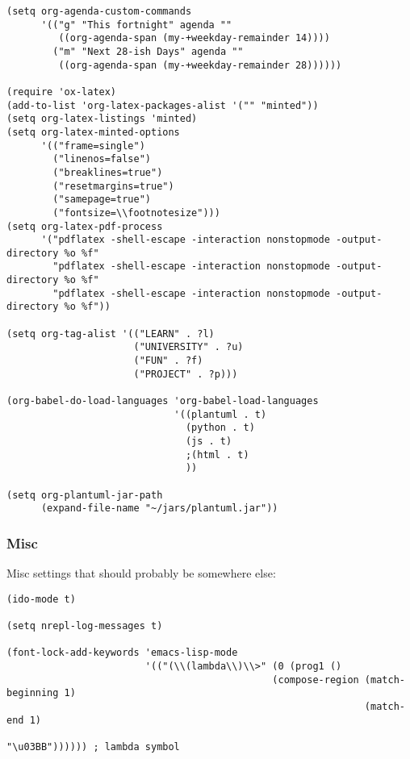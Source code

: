 \documentclass[11pt]{article}
\begin{document}
\begin{enumerate}
\begin{verbatim}
(setq org-agenda-custom-commands
      '(("g" "This fortnight" agenda ""
         ((org-agenda-span (my-+weekday-remainder 14))))
        ("m" "Next 28-ish Days" agenda ""
         ((org-agenda-span (my-+weekday-remainder 28))))))

(require 'ox-latex)
(add-to-list 'org-latex-packages-alist '("" "minted"))
(setq org-latex-listings 'minted)
(setq org-latex-minted-options
      '(("frame=single") 
        ("linenos=false")
        ("breaklines=true")
        ("resetmargins=true")
        ("samepage=true")
        ("fontsize=\\footnotesize")))
(setq org-latex-pdf-process
      '("pdflatex -shell-escape -interaction nonstopmode -output-directory %o %f"
        "pdflatex -shell-escape -interaction nonstopmode -output-directory %o %f"
        "pdflatex -shell-escape -interaction nonstopmode -output-directory %o %f"))

(setq org-tag-alist '(("LEARN" . ?l)
                      ("UNIVERSITY" . ?u)
                      ("FUN" . ?f)
                      ("PROJECT" . ?p)))

(org-babel-do-load-languages 'org-babel-load-languages
                             '((plantuml . t)
                               (python . t)
                               (js . t)
                               ;(html . t)
                               ))

(setq org-plantuml-jar-path
      (expand-file-name "~/jars/plantuml.jar"))
\end{verbatim}
\end{enumerate}

\subsubsection{Misc}
\label{sec-1-2-3}
Misc settings that should probably be somewhere else:

\begin{verbatim}
(ido-mode t)

(setq nrepl-log-messages t)

(font-lock-add-keywords 'emacs-lisp-mode
                        '(("(\\(lambda\\)\\>" (0 (prog1 ()
                                              (compose-region (match-beginning 1)
                                                              (match-end 1)
                                                              "\u03BB")))))) ; lambda symbol
\end{verbatim}
\end{document}
